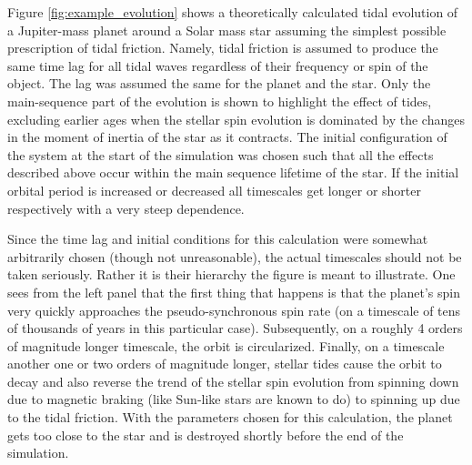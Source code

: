 Figure \ref{fig:example_evolution} shows a theoretically calculated tidal
evolution of a Jupiter-mass planet around a Solar mass star assuming the
simplest possible prescription of tidal friction. Namely, tidal friction is
assumed to produce the same time lag for all tidal waves regardless of their
frequency or spin of the object. The lag was assumed the same for the planet and
the star. Only the main-sequence part of the evolution is shown to highlight the
effect of tides, excluding  earlier ages when the stellar spin evolution is
dominated by the changes in the moment of inertia of the star as it contracts.
The initial configuration of the system at the start of the simulation was
chosen such that all the effects described above occur within the main sequence
lifetime of the star. If the initial orbital period is increased or decreased
all timescales get longer or shorter respectively with a very steep dependence.

Since the time lag and initial conditions for this calculation were somewhat
arbitrarily chosen (though not unreasonable), the actual timescales should not
be taken seriously. Rather it is their hierarchy the figure is meant to
illustrate. One sees from the left panel that the first thing that happens is
that the planet's spin very quickly approaches the pseudo-synchronous spin rate
(on a timescale of tens of thousands of years in this particular case).
Subsequently, on a roughly 4 orders of magnitude longer timescale, the orbit is
circularized. Finally, on a timescale another one or two orders of magnitude
longer, stellar tides cause the orbit to decay and also reverse the trend of the
stellar spin evolution from spinning down due to magnetic braking (like Sun-like
stars are known to do) to spinning up due to the tidal friction. With the
parameters chosen for this calculation, the planet gets too close to the star
and is destroyed shortly before the end of the simulation.

